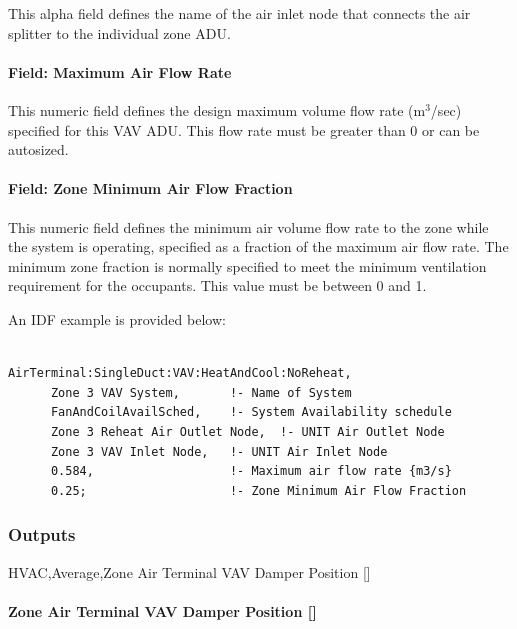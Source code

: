 This alpha field defines the name of the air inlet node that connects the air splitter to the individual zone ADU.

\paragraph{Field: Maximum Air Flow Rate}\label{field-maximum-air-flow-rate-5}

This numeric field defines the design maximum volume flow rate (m\(^{3}\)/sec) specified for this VAV ADU. This flow rate must be greater than 0 or can be autosized.

\paragraph{Field: Zone Minimum Air Flow Fraction}\label{field-zone-minimum-air-flow-fraction-2}

This numeric field defines the minimum air volume flow rate to the zone while the system is operating, specified as a fraction of the maximum air flow rate. The minimum zone fraction is normally specified to meet the minimum ventilation requirement for the occupants. This value must be between 0 and 1.

An IDF example is provided below:

\begin{lstlisting}

AirTerminal:SingleDuct:VAV:HeatAndCool:NoReheat,
      Zone 3 VAV System,       !- Name of System
      FanAndCoilAvailSched,    !- System Availability schedule
      Zone 3 Reheat Air Outlet Node,  !- UNIT Air Outlet Node
      Zone 3 VAV Inlet Node,   !- UNIT Air Inlet Node
      0.584,                   !- Maximum air flow rate {m3/s}
      0.25;                    !- Zone Minimum Air Flow Fraction
\end{lstlisting}

\subsubsection{Outputs}\label{outputs-6}

HVAC,Average,Zone Air Terminal VAV Damper Position {[]}

\paragraph{\texorpdfstring{Zone Air Terminal VAV Damper Position {[]}}{Zone Air Terminal VAV Damper Position }}\label{zone-air-terminal-vav-damper-position-4}

